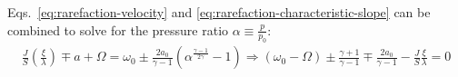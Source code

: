Eqs.~\ref{eq:rarefaction-velocity} and \ref{eq:rarefaction-characteristic-slope} can be combined to solve for the pressure ratio $\alpha \equiv \frac{p}{p_0}$:
\begin{equation}
\label{eq:rarefaction-internal-pressure}
\begin{array}{c}
\frac{J}{S}\left( {\frac{\xi }{\lambda }} \right) \mp a + \Omega  = {\omega _0} \pm \frac{{2{a_0}}}{{\gamma  - 1}}\left( {{\alpha ^{\frac{{\gamma  - 1}}{{2\gamma }}}} - 1} \right) \Rightarrow \left( {{\omega _0} - \Omega } \right) \pm \frac{{\gamma  + 1}}{{\gamma  - 1}} \mp \frac{{2{a_0}}}{{\gamma  - 1}} - \frac{J}{S}\frac{\xi }{\lambda } = 0\\

\end{array}
\end{equation}
